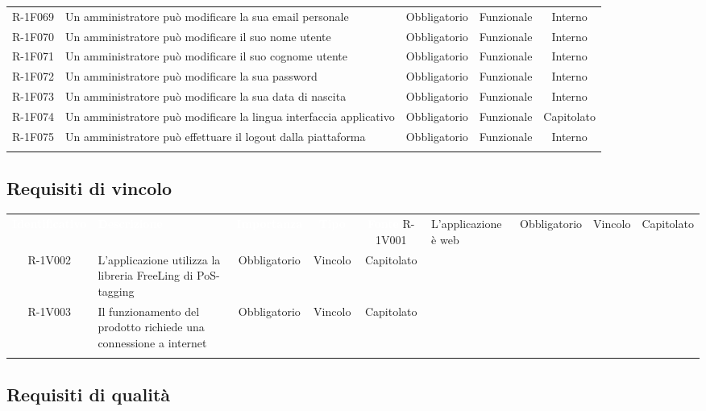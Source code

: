 \begin{tabularx}{\textwidth}{cXccc}
			R-1F069 & Un amministratore può modificare la sua email personale & Obbligatorio & Funzionale & Interno \\
			R-1F070 & Un amministratore può modificare il suo nome utente & Obbligatorio & Funzionale & Interno \\
			R-1F071 & Un amministratore può modificare il suo cognome utente & Obbligatorio & Funzionale & Interno \\
			R-1F072 & Un amministratore può modificare la sua password & Obbligatorio & Funzionale & Interno \\
			R-1F073 & Un amministratore può modificare la sua data di nascita & Obbligatorio & Funzionale & Interno \\
			R-1F074 & Un amministratore può modificare la lingua interfaccia applicativo & Obbligatorio & Funzionale & Capitolato \\
			R-1F075 & Un amministratore può effettuare il logout dalla piattaforma & Obbligatorio & Funzionale & Interno \\

\rowcolor{white}
\caption{Tabella requisiti funzionali} \label{tab:tabellarequisitifunzionali}
\end{tabularx}
\subsection{Requisiti di vincolo} 
\begin{tabularx}{\textwidth}{cXccc}
	
	\rowcolor{greySWEight}
	\textcolor{white}{\textbf{Identificativo}} &
	\textcolor{white}{\textbf{Descrizione}}&
	\textcolor{white}{\textbf{Importanza}}&
	\textcolor{white}{\textbf{Tipo}}&
	\textcolor{white}{\textbf{Fonte}}
	\endhead
		R-1V001 & L’applicazione è web & Obbligatorio & Vincolo & Capitolato \\
		R-1V002 & L’applicazione utilizza la libreria FreeLing di PoS-tagging & Obbligatorio & Vincolo & Capitolato \\
		R-1V003 & Il funzionamento del prodotto richiede una
		connessione a internet & Obbligatorio & Vincolo & Capitolato \\	
	\caption{Tabella requisiti di vincolo} \label{tab:tabellarequisitivincolo}
\end{tabularx}


\newpage
\subsection{Requisiti di qualità} 

